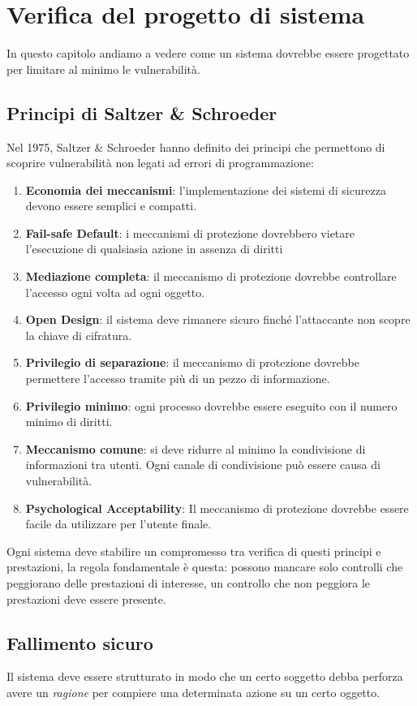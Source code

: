 \chapter{Verifica del progetto di sistema}
In questo capitolo andiamo a vedere come un sistema dovrebbe essere progettato per limitare al minimo le
vulnerabilità.

\section{Principi di Saltzer \& Schroeder}
Nel 1975, Saltzer \& Schroeder hanno definito dei principi che permettono di scoprire vulnerabilità non legati ad
errori di programmazione:
\begin{enumerate}
	\item \textbf{Economia dei meccanismi}: l'implementazione dei sistemi di
	      sicurezza devono essere semplici e compatti.
	\item \textbf{Fail-safe Default}: i meccanismi di protezione dovrebbero
	      vietare l'esecuzione di qualsiasia azione in assenza di diritti
	\item \textbf{Mediazione completa}: il meccanismo di protezione dovrebbe
	      controllare l'accesso ogni volta ad ogni oggetto.
	\item \textbf{Open Design}: il sistema deve rimanere sicuro finché
	      l'attaccante non scopre la chiave di cifratura.
	\item \textbf{Privilegio di separazione}: il meccanismo di protezione
	      dovrebbe permettere l'accesso tramite più di un pezzo di
	      informazione.
	\item \textbf{Privilegio minimo}: ogni processo dovrebbe essere eseguito
	      con il numero minimo di diritti.
	\item \textbf{Meccanismo comune}: si deve ridurre al minimo la
	      condivisione di informazioni tra utenti. Ogni canale di
	      condivisione può essere causa di vulnerabilità.
	\item \textbf{Psychological Acceptability}: Il meccanismo di protezione dovrebbe essere facile da utilizzare
	      per l'utente finale.
\end{enumerate}
Ogni sistema deve stabilire un compromesso tra verifica di questi principi e prestazioni, la regola fondamentale è
questa: possono mancare solo controlli che peggiorano delle prestazioni di interesse, un controllo che non peggiora
le prestazioni deve essere presente.

\section{Fallimento sicuro}
Il sistema deve essere strutturato in modo che un certo soggetto debba perforza avere un \emph{ragione} per compiere
una determinata azione su un certo oggetto.

